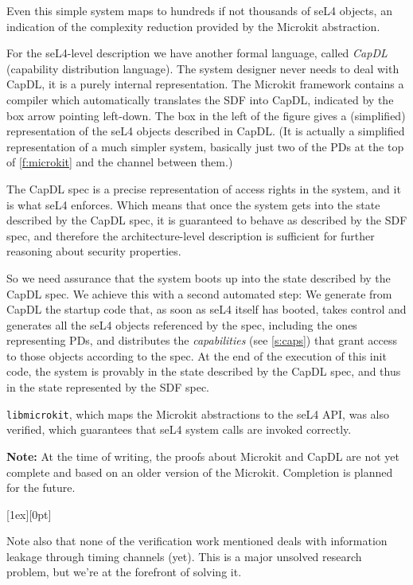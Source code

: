 \documentclass[english,a4paper,12pt]{report}
\newcommand{\code}[1]{\texttt{#1}}
\newlength{\chillilng}\setlength{\chillilng}{8mm}
\newlength{\chillimarg}\setlength{\chillimarg}{10mm}
\newcommand{\chilli}{\texttt{[image: chilli]}}
\newcommand{\chilliItem}{\raisebox{-5mm}[1ex][0pt]{%
      \makebox[\chillilng][r]{\chilli}}}
\newenvironment{Chilli}{
    \begin{list}{}{
      \setlength{\labelwidth}{\chillilng}
      \setlength{\leftmargin}{\chillimarg}}
    \item[\chilliItem]
    }
  {\end{list}}
\begin{document}
  Even this simple system maps to hundreds if not thousands of seL4
  objects, an indication of the complexity reduction provided by the
  Microkit abstraction.

  For the seL4-level description we have another formal language,
  called \emph{CapDL} (capability distribution language). The system designer
  never needs to deal with CapDL, it is a purely internal
  representation. The Microkit framework contains a compiler which
  automatically translates the SDF into CapDL, indicated by the box
  arrow pointing left-down. The box in the left of the figure gives a
  (simplified) representation of the seL4 objects described in
  CapDL. (It is actually a simplified representation of a much simpler
  system, basically just two of the PDs at the top of
  \autoref{f:microkit} and the channel between them.)

  The CapDL spec is a precise representation of access rights in the
  system, and it is what seL4 enforces. Which means that once the
  system gets into the state described by the CapDL spec, it is
  guaranteed to behave as described by the SDF spec, and
  therefore the architecture-level description is sufficient for
  further reasoning about security properties.

  So we need assurance that the system boots up into the state
  described by the CapDL spec. We achieve this with a second
  automated step: We generate from CapDL the startup code that, as
  soon as seL4 itself has booted, takes control and generates all the
  seL4 objects referenced by the spec, including the ones representing
  PDs, and distributes the \emph{capabilities} (see
  \autoref{s:caps}) that grant access to those objects according to
  the spec. At the end of the execution of this init code, the system is
  provably in the state described by the CapDL spec, and thus in the
  state represented by the SDF spec.

  \code{libmicrokit}, which maps the Microkit abstractions to the seL4 API,
  was also verified, which guarantees that seL4 system calls are invoked correctly.

  \textbf{Note:} At the time of writing, the proofs about Microkit and
  CapDL are not yet complete and based on an older version of the
  Microkit.  Completion is planned for the future.

  \begin{Chilli}
    Note also that none of the verification work mentioned deals with
    information leakage through timing channels (yet). This is a
    major unsolved research problem, but we're at the forefront of
    solving it.
  \end{Chilli}
\end{document}
